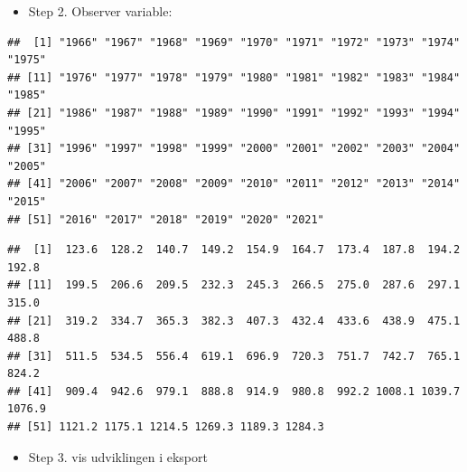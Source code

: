 \documentclass[
  12pt,
]{article}
\newenvironment{Shaded}{\begin{snugshade}}{\end{snugshade}}
\newcommand{\AttributeTok}[1]{\textcolor[rgb]{0.77,0.63,0.00}{#1}}
\newcommand{\DecValTok}[1]{\textcolor[rgb]{0.00,0.00,0.81}{#1}}
\newcommand{\FunctionTok}[1]{\textcolor[rgb]{0.00,0.00,0.00}{#1}}
\newcommand{\NormalTok}[1]{#1}
\newcommand{\SpecialCharTok}[1]{\textcolor[rgb]{0.00,0.00,0.00}{#1}}
\newcommand{\StringTok}[1]{\textcolor[rgb]{0.31,0.60,0.02}{#1}}
\providecommand{\tightlist}{%
  \setlength{\itemsep}{0pt}\setlength{\parskip}{0pt}}
\begin{document}
\begin{itemize}
\tightlist
\item
  Step 2. Observer variable:
\end{itemize}

\begin{Shaded}
\end{Shaded}

\begin{verbatim}
##  [1] "1966" "1967" "1968" "1969" "1970" "1971" "1972" "1973" "1974" "1975"
## [11] "1976" "1977" "1978" "1979" "1980" "1981" "1982" "1983" "1984" "1985"
## [21] "1986" "1987" "1988" "1989" "1990" "1991" "1992" "1993" "1994" "1995"
## [31] "1996" "1997" "1998" "1999" "2000" "2001" "2002" "2003" "2004" "2005"
## [41] "2006" "2007" "2008" "2009" "2010" "2011" "2012" "2013" "2014" "2015"
## [51] "2016" "2017" "2018" "2019" "2020" "2021"
\end{verbatim}

\begin{Shaded}
\end{Shaded}

\begin{verbatim}
##  [1]  123.6  128.2  140.7  149.2  154.9  164.7  173.4  187.8  194.2  192.8
## [11]  199.5  206.6  209.5  232.3  245.3  266.5  275.0  287.6  297.1  315.0
## [21]  319.2  334.7  365.3  382.3  407.3  432.4  433.6  438.9  475.1  488.8
## [31]  511.5  534.5  556.4  619.1  696.9  720.3  751.7  742.7  765.1  824.2
## [41]  909.4  942.6  979.1  888.8  914.9  980.8  992.2 1008.1 1039.7 1076.9
## [51] 1121.2 1175.1 1214.5 1269.3 1189.3 1284.3
\end{verbatim}

\begin{itemize}
\tightlist
\item
  Step 3. vis udviklingen i eksport
\end{itemize}

\begin{Shaded}
\end{Shaded}
\end{document}
